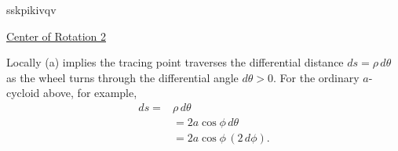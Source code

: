 \documentclass{ximera}
\begin{document}

\begin{onlineOnly}
    \begin{center}
   sskpikivqv %
\end{center}
\end{onlineOnly}

\href{https://www.desmos.com/calculator/sskpikivqv}{Center of Rotation 2}


Locally (a) implies the tracing point traverses the differential distance $ds = \rho \, d\theta$ as the wheel turns through the differential angle $d\theta>0$. For the ordinary $a$-cycloid above, for example, 
\begin{align*}
     ds = &\rho \, d\theta \\
             &= 2a \cos\phi\, d\theta \\
              &= 2a \cos \phi \, (2 \, d\phi) .  
\end{align*}
\end{document}
